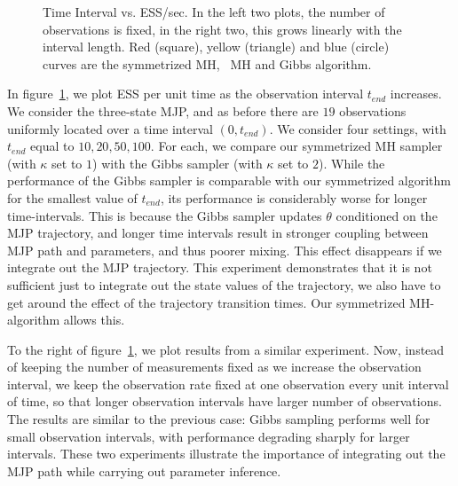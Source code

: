 {\begin{figure}
\begin{minipage}[hp]{0.24\linewidth}
  \end{minipage}
    \caption{Time Interval vs. ESS/sec. In the left two plots, the number of 
    observations is fixed, in the right two, this grows linearly with the
    interval length. Red (square), yellow (triangle) and blue (circle) 
    curves are the symmetrized MH,
  \naive\ MH and Gibbs algorithm.}
     \label{fig:TSS}
  \end{figure}
In figure~\ref{fig:TSS}, we plot ESS per unit time as the observation 
interval $t_{end}$ increases. We consider the three-state MJP, and as before there 
are $19$ observations uniformly located over a time interval $(0,t_{end})$. We 
consider four settings, with $t_{end}$ equal to $10, 20, 50, 100$. For each, we 
compare our symmetrized MH sampler (with $\kappa$ set to $1$) with the Gibbs 
sampler (with $\kappa$ set to $2$). While the performance of the Gibbs sampler 
is comparable with our symmetrized algorithm for the smallest value of 
$t_{end}$, its performance is considerably worse for longer time-intervals. 
This is because the Gibbs sampler updates $\theta$ conditioned on the MJP
trajectory, and longer time intervals result in stronger coupling 
between MJP path and parameters, and thus poorer mixing. This effect 
disappears if we integrate out the MJP trajectory. This experiment 
demonstrates that it is not sufficient just to integrate out the state 
values of the trajectory, we also have to get around the effect 
of the trajectory transition times. Our symmetrized MH-algorithm allows 
this. 


To the right of figure~\ref{fig:TSS}, we plot results from a similar experiment. Now,
instead of keeping the number of measurements fixed as we increase the 
observation interval, we keep the observation rate fixed at one observation 
every unit interval of time, so that longer observation intervals have larger 
number of observations. The results are similar to the previous case: Gibbs 
sampling performs well for small observation intervals, with performance 
degrading sharply for larger intervals. These two experiments 
illustrate the importance of integrating out the MJP path while 
carrying out parameter inference.

}
